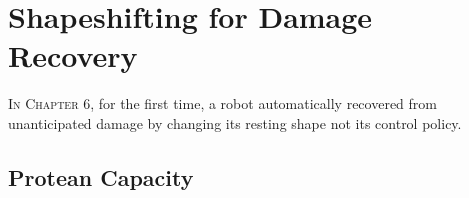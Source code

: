 





\section{Shapeshifting for Damage Recovery}


\textsc{In Chapter 6,}
for the first time, a robot automatically recovered from unanticipated damage by changing its resting shape not its control policy.

\subsection{Protean Capacity}

